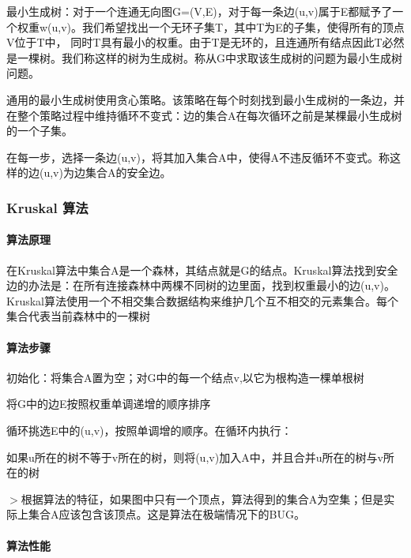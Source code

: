 最小生成树：对于一个连通无向图\+G=(V,E)，对于每一条边(u,v)属于\+E都赋予了一个权重w(u,v)。我们希望找出一个无环子集\+T，其中\+T为\+E的子集，使得所有的顶点\+V位于\+T中， 同时\+T具有最小的权重。由于\+T是无环的，且连通所有结点因此\+T必然是一棵树。我们称这样的树为生成树。称从\+G中求取该生成树的问题为最小生成树问题。

通用的最小生成树使用贪心策略。该策略在每个时刻找到最小生成树的一条边，并在整个策略过程中维持循环不变式：边的集合\+A在每次循环之前是某棵最小生成树的一个子集。

在每一步，选择一条边(u,v)，将其加入集合\+A中，使得\+A不违反循环不变式。称这样的边(u,v)为边集合\+A的安全边。

\subsubsection*{Kruskal 算法}

\paragraph*{算法原理}

在\+Kruskal算法中集合\+A是一个森林，其结点就是\+G的结点。\+Kruskal算法找到安全边的办法是：在所有连接森林中两棵不同树的边里面，找到权重最小的边(u,v)。 Kruskal算法使用一个不相交集合数据结构来维护几个互不相交的元素集合。每个集合代表当前森林中的一棵树

\paragraph*{算法步骤}


\begin{DoxyItemize}
\item 初始化：将集合\+A置为空；对\+G中的每一个结点v,以它为根构造一棵单根树
\item 将\+G中的边\+E按照权重单调递增的顺序排序
\item 循环挑选\+E中的(u,v)，按照单调增的顺序。在循环内执行：
\begin{DoxyItemize}
\item 如果u所在的树不等于v所在的树，则将(u,v)加入\+A中，并且合并u所在的树与v所在的树
\end{DoxyItemize}
\end{DoxyItemize}

$>$根据算法的特征，如果图中只有一个顶点，算法得到的集合\+A为空集；但是实际上集合\+A应该包含该顶点。这是算法在极端情况下的\+B\+U\+G。

\paragraph*{算法性能}


